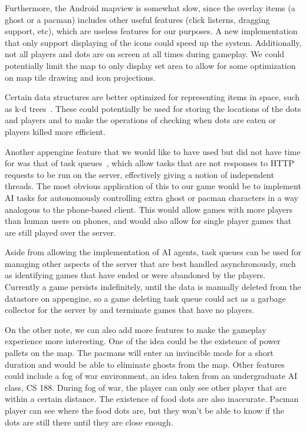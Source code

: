 \documentclass{acm_proc_article-sp}
\begin{document}
Furthermore, the Android mapview is somewhat slow, since the overlay items (a
ghost or a pacman) includes other useful features (click listerns, dragging
support, etc), which are useless features for our purposes. A new
implementation that only support displaying of the icons could speed up the
system. Additionally, not all players and dots are on screen at all times
during gameplay.  We could potentially limit the map to only display set area
to allow for some optimization on map tile drawing and icon projections.

Certain data structures are better optimized for representing items in space, such as k-d trees~\cite{Bentley:1975:kdtrees}. These could potentially be used for storing the locations of the dots and players and to make the operations of checking when dots are eaten or players killed more efficient.

Another appengine feature that we would like to have used but did not have time
for was that of task queues~\cite{TaskQueuesAppengine}, which allow tasks that
are not responses to HTTP requests to be run on the server, effectively
giving a notion of independent threads.  The most obvious application of this
to our game would be to implement AI tasks for autonomously controlling
extra ghost or pacman characters in a way analogous to the phone-based client.
This would allow games with more players than human users on phones, and would
also allow for single player games that are still played over the server.


Aside from allowing the implementation of AI agents, task queues can be used
for managing other aspects of the server that are best handled asynchronously,
such as identifying games that have ended or were abandoned by the players.
Currently a game persists indefinitely, until the data is manually deleted from
the datastore on appengine, so a game deleting task queue could act as a
garbage collector for the server by and terminate games that have no players.


On the other note, we can also add more features to make the gameplay
experience more interesting. One of the idea could be the existence of
power pallets on the map. The pacmans will enter an invincible mode
for a short duration and would be able to eliminate ghosts from the
map. Other features could include a fog of war environment, an idea
taken from an undergraduate AI class, CS 188. During fog of war, the
player can only see other player that are within a certain
distance. The existence of food dots are also inaccurate. Pacman
player can see where the food dots are, but they won't be able to know
if the dots are still there until they are close enough.
\end{document}
